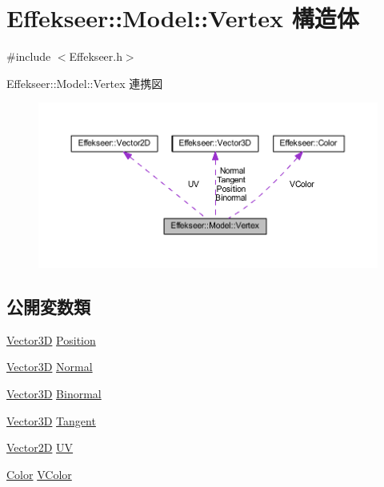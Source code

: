 \hypertarget{struct_effekseer_1_1_model_1_1_vertex}{}\section{Effekseer\+:\+:Model\+:\+:Vertex 構造体}
\label{struct_effekseer_1_1_model_1_1_vertex}


{\ttfamily \#include $<$Effekseer.\+h$>$}



Effekseer\+:\+:Model\+:\+:Vertex 連携図\nopagebreak
\begin{figure}[H]
\begin{center}
\leavevmode
\includegraphics[width=350pt]{struct_effekseer_1_1_model_1_1_vertex__coll__graph}
\end{center}
\end{figure}
\subsection*{公開変数類}
\begin{DoxyCompactItemize}
\item 
\mbox{\hyperlink{struct_effekseer_1_1_vector3_d}{Vector3D}} \mbox{\hyperlink{struct_effekseer_1_1_model_1_1_vertex_ab60ea714b94ff69deea1ce8c4ab5b2af}{Position}}
\item 
\mbox{\hyperlink{struct_effekseer_1_1_vector3_d}{Vector3D}} \mbox{\hyperlink{struct_effekseer_1_1_model_1_1_vertex_ad06ee8e47ca58d8da3ec6ba9aac1854e}{Normal}}
\item 
\mbox{\hyperlink{struct_effekseer_1_1_vector3_d}{Vector3D}} \mbox{\hyperlink{struct_effekseer_1_1_model_1_1_vertex_adc3b1c24c0a4ad31aa3baeeaeab77454}{Binormal}}
\item 
\mbox{\hyperlink{struct_effekseer_1_1_vector3_d}{Vector3D}} \mbox{\hyperlink{struct_effekseer_1_1_model_1_1_vertex_a5140b60278c5fb4b6d99afbf7966eb1a}{Tangent}}
\item 
\mbox{\hyperlink{struct_effekseer_1_1_vector2_d}{Vector2D}} \mbox{\hyperlink{struct_effekseer_1_1_model_1_1_vertex_a4b16f6ed12f2a67a6064728c7fe37d7f}{UV}}
\item 
\mbox{\hyperlink{struct_effekseer_1_1_color}{Color}} \mbox{\hyperlink{struct_effekseer_1_1_model_1_1_vertex_a41a843c2f7d16433de79a01837a91a7f}{V\+Color}}
\end{DoxyCompactItemize}


